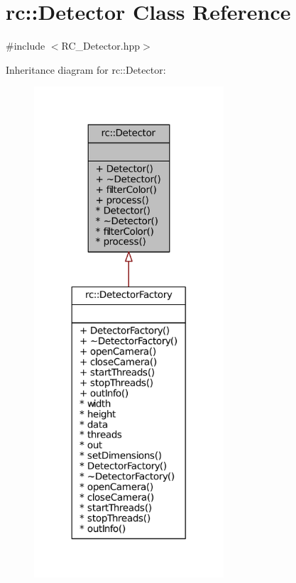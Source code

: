 \hypertarget{classrc_1_1Detector}{\section{rc\+:\+:Detector Class Reference}
\label{classrc_1_1Detector}
}


{\ttfamily \#include $<$R\+C\+\_\+\+Detector.\+hpp$>$}



Inheritance diagram for rc\+:\+:Detector\+:\nopagebreak
\begin{figure}[H]
\begin{center}
\leavevmode
\includegraphics[width=200pt]{classrc_1_1Detector__inherit__graph}
\end{center}
\end{figure}


